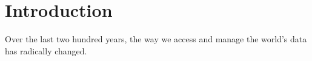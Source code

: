 \section{Introduction}

Over the last two hundred years, the way we access and manage the world's data has radically changed. \cite{bankofengland:2016:online}
